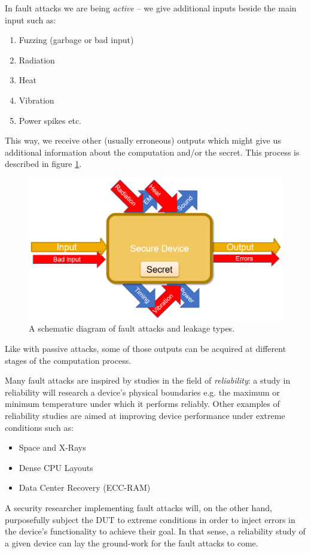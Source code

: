 In fault attacks we are being \emph{active} -- we give additional inputs beside the main input such as:
\begin{enumerate}
	\item Fuzzing (garbage or bad input)
	\item Radiation
	\item Heat
	\item Vibration
	\item Power spikes etc.
\end{enumerate}

This way, we receive other (usually erroneous) outputs which might give us additional information about the computation and/or the secret. This process is described in figure \ref{fig:fault_attacks_schematic}.

\begin{figure}[!ht]
	\centering
	\includegraphics[width=0.7\linewidth]{images/ch9/fault_attacks_schematic.png}
	\caption{A schematic diagram of fault attacks and leakage types.}
	\label{fig:fault_attacks_schematic}
\end{figure}

Like with passive attacks, some of those outputs can be acquired at different stages of the computation process.

Many fault attacks are inspired by studies in the field of \emph{reliability}: a study in reliability will research a device's physical boundaries e.g. the maximum or minimum temperature under which it performs reliably. Other examples of reliability studies are aimed at improving device performance under extreme conditions such as:
\begin{itemize}
	\item Space and X-Rays
	\item Dense CPU Layouts
	\item Data Center Recovery (ECC-RAM)
\end{itemize}

A security researcher implementing fault attacks will, on the other hand,  purposefully subject the DUT to extreme conditions in order to inject errors in the device's functionality to achieve their goal. In that sense, a reliability study of a given device can lay the ground-work for the fault attacks to come.

